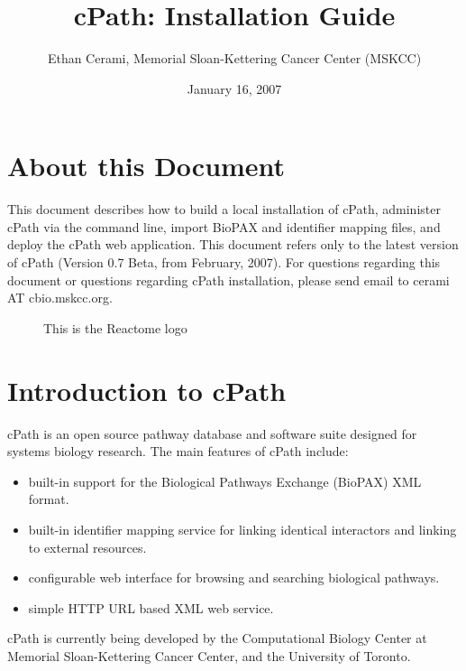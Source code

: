 \documentclass{article}
\title{cPath:  Installation Guide}
\author{Ethan Cerami, Memorial Sloan-Kettering Cancer Center (MSKCC)}
\date{January 16, 2007}
\begin{document}
\maketitle

\section{About this Document}

This document describes how to build a local installation of cPath, administer cPath via the command line, import BioPAX and identifier mapping files, and deploy the cPath web application.  This document refers only to the latest version of cPath (Version 0.7 Beta, from February, 2007).  For questions regarding this document or questions regarding cPath installation, please send email to cerami AT cbio.mskcc.org.

\begin{figure}[htbp]
  \centering
  \caption{This is the Reactome logo}
  \label{Reactome}
\end{figure}

\section{Introduction to cPath}

cPath is an open source pathway database and software suite designed for systems biology research. The main features of cPath include:

\begin{itemize}

  \item built-in support for the Biological Pathways Exchange (BioPAX) XML format.

  \item built-in identifier mapping service for linking identical interactors and linking to external resources.

  \item configurable web interface for browsing and searching biological pathways.

  \item simple HTTP URL based XML web service.

\end{itemize}

cPath is currently being developed by the Computational Biology Center at Memorial Sloan-Kettering Cancer Center, and the University of Toronto.
\end{document}
